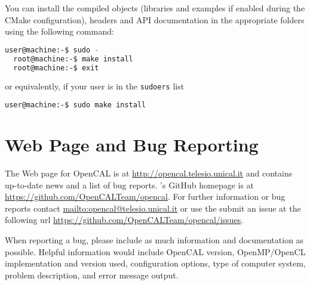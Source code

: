 You can install the compiled objects (libraries and examples if
enabled during the CMake configuration), headers and API documentation
in the appropriate folders using the following command:

\begin{lstlisting}[numbers=none,language=bash,label={ch:quickstart:install}]
  user@machine:-$ sudo - 
  root@machine:-$ make install
  root@machine:-$ exit
\end{lstlisting}

or equivalently, if your user is in the \texttt{sudoers} list

\begin{lstlisting}[numbers=none,language=bash,label={ch:quickstart:sudoinstall}]
  user@machine:-$ sudo make install
\end{lstlisting}


\section{Web Page and Bug Reporting}

The Web page for OpenCAL is at \url{http://opencal.telesio.unical.it} and
contains up-to-date news and a list of bug reports. \ocal's GitHub
homepage is at \url{https://github.com/OpenCALTeam/opencal}. For
further information or bug reports contact
\url{mailto:opencal@telesio.unical.it} or use the submit an issue at the
following url \url{https://github.com/OpenCALTeam/opencal/issues}.

When reporting a bug, please include as much information and
documentation as possible. Helpful information would include OpenCAL
version, OpenMP/OpenCL implementation and version used,
configuration options, type of computer system, problem description,
and error message output.

